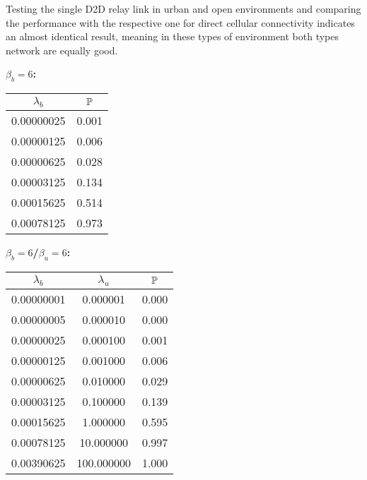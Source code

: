 \vspace{1.5em}{\bf Analysis:} Testing the single D2D relay link in urban and open environments and comparing the performance with the respective one for direct cellular connectivity indicates an almost identical result, meaning in these types of environment both types network are equally good. 
\begin{figure}[!hb]
  \caption {}
\end{figure}
\FloatBarrier
\begin{minipage}{.45\textwidth}
	{\bf \(\beta_b=6\):}
	\begin{tabular}{|c|c|}
	\(\lambda_b\) & \(\P\) \\ \hline
	0.00000025 & 0.001 \\ \hline
	0.00000125 & 0.006 \\ \hline
	0.00000625 & 0.028 \\ \hline
	0.00003125 & 0.134 \\ \hline
	0.00015625 & 0.514 \\ \hline
	0.00078125 & 0.973 \\ \hline
	\end{tabular}
\end{minipage}
\begin{minipage}{.3\textwidth}
	{\bf \(\beta_b=6\)/\(\beta_u=6\):}
	\begin{tabular}{|c|c|c|}
	\(\lambda_b\) & \(\lambda_u\) & \(\P\) \\ \hline
	0.00000001 & 0.000001 & 0.000 \\ \hline
	0.00000005 & 0.000010 & 0.000 \\ \hline
	0.00000025 & 0.000100 & 0.001 \\ \hline
	0.00000125 & 0.001000 & 0.006 \\ \hline
	0.00000625 & 0.010000 & 0.029 \\ \hline
	0.00003125 & 0.100000 & 0.139 \\ \hline
	0.00015625 & 1.000000 & 0.595 \\ \hline
	0.00078125 & 10.000000 & 0.997 \\ \hline
	0.00390625 & 100.000000 & 1.000 \\ \hline
	\end{tabular}
\end{minipage}

